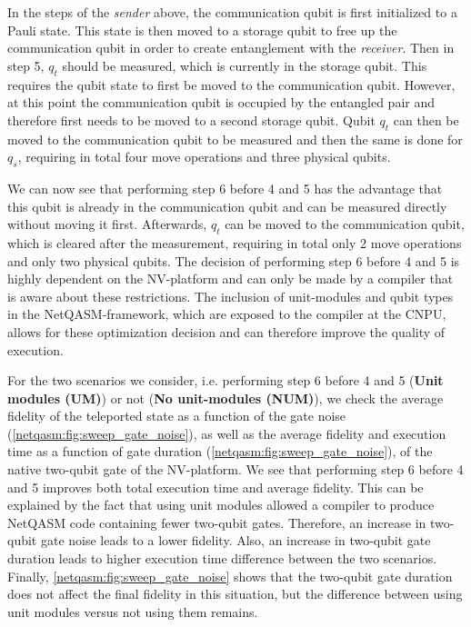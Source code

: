 In the steps of the \textit{sender} above, the communication qubit is first initialized to a Pauli state.
This state is then moved to a storage qubit to free up the communication qubit in order to create entanglement with the \textit{receiver}.
Then in step 5, $q_t$ should be measured, which is currently in the storage qubit.
This requires the qubit state to first be moved to the communication qubit.
However, at this point the communication qubit is occupied by the entangled pair and therefore first needs to be moved to a second storage qubit.
Qubit $q_t$ can then be moved to the communication qubit to be measured and then the same is done for $q_s$, requiring in total four move operations and three physical qubits.

We can now see that performing step 6 before 4 and 5 has the advantage that this qubit is already in the communication qubit and can be measured directly without moving it first.
Afterwards, $q_t$ can be moved to the communication qubit, which is cleared after the measurement, requiring in total only 2 move operations and only two physical qubits.
The decision of performing step 6 before 4 and 5 is highly dependent on the NV-platform and can only be made by a compiler that is aware about these restrictions.
The inclusion of unit-modules and qubit types in the \ac{NetQASM}-framework, which are exposed to the compiler at the \ac{CNPU}, allows for these optimization decision and can therefore improve the quality of execution.

For the two scenarios we consider, i.e. performing step 6 before 4 and 5 (\textbf{Unit modules (UM)}) or not (\textbf{No unit-modules (NUM)}), we check the average fidelity of the teleported state as a function of the gate noise (\cref{netqasm:fig:sweep_gate_noise}), as well as the average fidelity and execution time as a function of gate duration (\cref{netqasm:fig:sweep_gate_noise}), of the native two-qubit gate of the NV-platform. We see that performing step 6 before 4 and 5 improves both total execution time and average fidelity.
This can be explained by the fact that using unit modules allowed a compiler to produce \ac{NetQASM} code containing fewer two-qubit gates.
Therefore, an increase in two-qubit gate noise leads to a lower fidelity.
Also, an increase in two-qubit gate duration leads to higher execution time difference between the two scenarios.
Finally, \cref{netqasm:fig:sweep_gate_noise} shows that the two-qubit gate duration does not affect the final fidelity in this situation, but the difference between using unit modules versus not using them remains.






